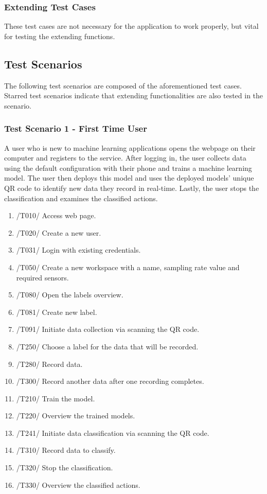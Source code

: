 \subsubsection{Extending Test Cases}
These test cases are not necessary for the application to work properly, but vital for testing the extending functions. 
\subsection{Test Scenarios}
The following test scenarios are composed of the aforementioned test cases. Starred test scenarios indicate that extending functionalities are also tested in the scenario.
\subsubsection{Test Scenario 1 - First Time User}
A user who is new to machine learning applications opens the webpage on their computer and registers to the service. After logging in, the user collects data using the default configuration with their phone and trains a machine learning model. The user then deploys this model and uses the deployed models' unique QR code to identify new data they record in real-time. Lastly, the user stops the classification and examines the classified actions.
\begin{enumerate}
    \item /T010/ Access web page.
    \item /T020/ Create a new user.
    \item /T031/ Login with existing credentials.
    \item /T050/ Create a new workspace with a name, sampling rate value and required sensors.
    \item /T080/ Open the labels overview.
    \item /T081/ Create new label.
    \item /T091/ Initiate data collection via scanning the QR code.
    \item /T250/ Choose a label for the data that will be recorded.
    \item /T280/ Record data.
    \item /T300/ Record another data after one recording completes.
    \item /T210/ Train the model.
    \item /T220/ Overview the trained models.
    \item /T241/ Initiate data classification via scanning the QR code.
    \item /T310/ Record data to classify.
    \item /T320/ Stop the classification.
    \item /T330/ Overview the classified actions.
\end{enumerate}
